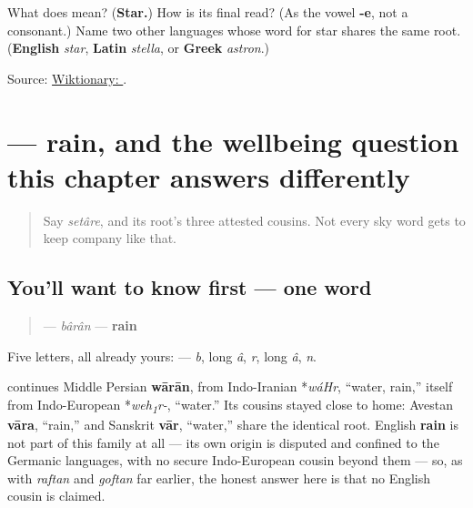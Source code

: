 \begin{tcolorbox}[breakable,colback=teal!4,colframe=teal!35!black,title={Before you move on}]
What does \textbf{} mean? (\textbf{Star.}) How is its final \textbf{} read? (As the vowel \textbf{-e}, not a consonant.) Name two other languages whose word for star shares the same root. (\textbf{English} \emph{star}, \textbf{Latin} \emph{stella}, or \textbf{Greek} \emph{astron}.)

Source: \href{https://en.wiktionary.org/wiki/\%D8\%B3\%D8\%AA\%D8\%A7\%D8\%B1\%D9\%87}{Wiktionary: }.
\end{tcolorbox}
\section[\texorpdfstring{\fa{باران} (bârân)}{باران (bârân)}]{ — rain, and the wellbeing question this chapter answers differently}

\label{lesson:FA-C13-baran}



\begin{quote}
Say \emph{setâre}, and its root's three attested cousins. Not every sky word gets to keep company like that.
\end{quote}

\subsection*{You'll want to know first — one word}
\begin{quote}
\textbf{} — \emph{bârân} — \textbf{rain}
\end{quote}

Five letters, all already yours: \textbf{    } — \emph{b}, long \emph{â}, \emph{r}, long \emph{â}, \emph{n}.

\begin{cousinweb}
\textbf{} continues Middle Persian \textbf{wārān}, from Indo-Iranian *\emph{wáHr}, \textquotedblleft{}water, rain,\textquotedblright{} itself from Indo-European *\emph{weh\textsubscript{1}r-}, \textquotedblleft{}water.\textquotedblright{} Its cousins stayed close to home: Avestan \textbf{vāra}, \textquotedblleft{}rain,\textquotedblright{} and Sanskrit \textbf{vār}, \textquotedblleft{}water,\textquotedblright{} share the identical root. English \textbf{rain} is not part of this family at all — its own origin is disputed and confined to the Germanic languages, with no secure Indo-European cousin beyond them — so, as with \emph{raftan} and \emph{goftan} far earlier, the honest answer here is that no English cousin is claimed.
\end{cousinweb}

